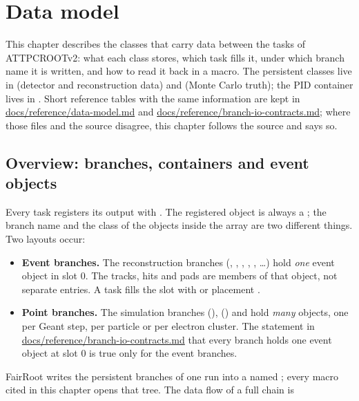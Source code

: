 \chapter{Data model}
\label{ch:datamodel}
\begingroup
\sloppy

This chapter describes the classes that carry data between the tasks of ATTPCROOTv2: what each class
stores, which task fills it, under which branch name it is written, and how to read it back in a macro.
The persistent classes live in  (detector and reconstruction data) and
 (Monte Carlo truth); the PID container  lives in
. Short reference tables with the same information are kept in
\url{docs/reference/data-model.md} and \url{docs/reference/branch-io-contracts.md}; where those files and
the source disagree, this chapter follows the source and says so.

\section{Overview: branches, containers and event objects}
\label{sec:dm-overview}

Every task registers its output with .
The registered object is always a ; the branch name and the class of the objects
inside the array are two different things. Two layouts occur:

\begin{itemize}
\item \textbf{Event branches.} The reconstruction branches (,
  , , , , \ldots) hold \emph{one} event
  object in slot 0. The tracks, hits and pads are members of that object, not separate
   entries. A task fills the slot with  or placement
  .
\item \textbf{Point branches.} The simulation branches  (),
   () and  hold \emph{many} objects, one per
  Geant step, per particle or per electron cluster. The statement in
  \url{docs/reference/branch-io-contracts.md} that every branch holds one event object at slot 0 is
  true only for the event branches.
\end{itemize}

FairRoot writes the persistent branches of one run into a  named ; every macro
cited in this chapter opens that tree. The data flow of a full chain is

